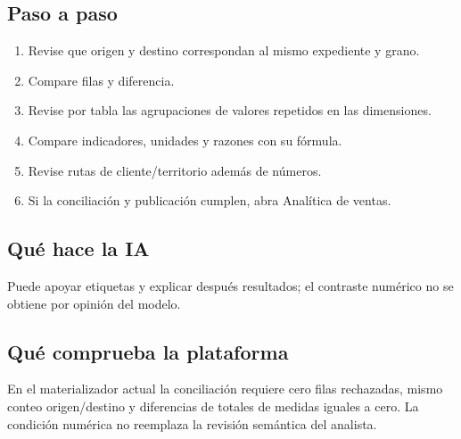 \subsection{Paso a paso}
\begin{enumerate}
\item Revise que origen y destino correspondan al mismo expediente y grano.\par\nopagebreak[4]
\item Compare filas y diferencia.\par\nopagebreak[4]
\item Revise por tabla las agrupaciones de valores repetidos en las dimensiones.\par\nopagebreak[4]
\item Compare indicadores, unidades y razones con su fórmula.\par\nopagebreak[4]
\item Revise rutas de cliente/territorio además de números.\par\nopagebreak[4]
\item Si la conciliación y publicación cumplen, abra Analítica de ventas.\par\nopagebreak[4]
\end{enumerate}
\subsection{Qué hace la IA}
Puede apoyar etiquetas y explicar después resultados; el contraste numérico no se obtiene por opinión del modelo.

\subsection{Qué comprueba la plataforma}
En el materializador actual la conciliación requiere cero filas rechazadas, mismo conteo origen/destino y diferencias de totales de medidas iguales a cero. La condición numérica no reemplaza la revisión semántica del analista.

